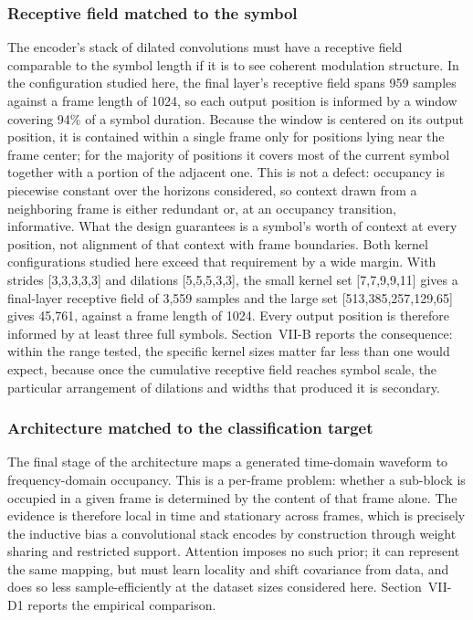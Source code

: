 \documentclass[lettersize,journal]{IEEEtran}
\begin{document}
\subsubsection{\textbf{Receptive field matched to the symbol}}
\label{sec:receptive}
The encoder's stack of dilated convolutions must have a receptive field
comparable to the symbol length if it is to see coherent modulation structure.
In the configuration studied here, the final layer's receptive field spans 959
samples against a frame length of 1024, so each output position is informed by a
window covering 94\% of a symbol duration. Because the window is centered on its
output position, it is contained within a single frame only for positions lying
near the frame center; for the majority of positions it covers most of the
current symbol together with a portion of the adjacent one. This is not a
defect: occupancy is piecewise constant over the horizons considered, so
context drawn from a neighboring frame is either redundant or, at an occupancy
transition, informative. What the design guarantees is a symbol's worth of
context at every position, not alignment of that context with frame boundaries.
Both kernel configurations studied here exceed that requirement by a wide
margin. With strides [3,3,3,3,3] and dilations [5,5,5,3,3], the small kernel set
[7,7,9,9,11] gives a final-layer receptive field of 3,559 samples and the
large set [513,385,257,129,65] gives 45,761, against a frame length of 1024.
Every output position is therefore informed by at least three full symbols.
Section~VII-B reports the consequence: within the range
tested, the specific kernel sizes matter far less than one would expect, because
once the cumulative receptive field reaches symbol scale, the particular
arrangement of dilations and widths that produced it is secondary.

\subsubsection{\textbf{Architecture matched to the classification target}}
\label{sec:ablation_head}
The final stage of the architecture maps a generated time-domain waveform to
frequency-domain occupancy. This is a per-frame problem: whether a sub-block is
occupied in a given frame is determined by the content of that frame alone. The
evidence is therefore local in time and stationary across frames, which is
precisely the inductive bias a convolutional stack encodes by construction
through weight sharing and restricted support. Attention imposes no such prior;
it can represent the same mapping, but must learn locality and shift covariance
from data, and does so less sample-efficiently at the dataset sizes considered
here. Section~VII-D1 reports the empirical comparison.
\end{document}
